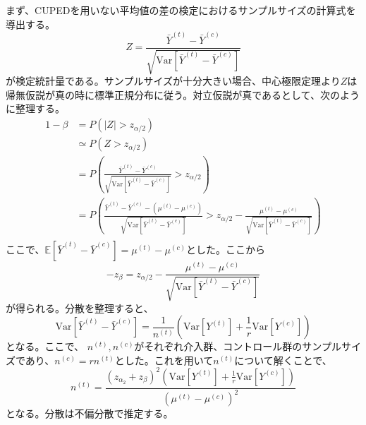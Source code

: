 まず、CUPEDを用いない平均値の差の検定におけるサンプルサイズの計算式を導出する。
\begin{equation}
    Z = \frac{\bar{Y}^{(t)} - \bar{Y}^{(c)}}{\sqrt{\text{Var}[\bar{Y}^{(t)} - \bar{Y}^{(c)}]}}
\end{equation}
が検定統計量である。サンプルサイズが十分大きい場合、中心極限定理より$Z$は帰無仮説が真の時に標準正規分布に従う。対立仮説が真であるとして、次のように整理する。
\begin{align}
    1 - \beta & = P(|Z| > z_{\alpha/2})                                                                                                                                                                                                          \\
              & \simeq P(Z > z_{\alpha / 2})                                                                                                                                                                                                     \\
              & = P\left(\frac{\bar{Y}^{(t)} - \bar{Y}^{(c)}}{\sqrt{\text{Var}[\bar{Y}^{(t)} - \bar{Y}^{(c)}]}} > z_{\alpha/2}\right)                                                                                                            \\
              & = P\left(\frac{\bar{Y}^{(t)} - \bar{Y}^{(c)} - (\mu^{(t)} - \mu^{(c)})}{\sqrt{\text{Var}[\bar{Y}^{(t)} - \bar{Y}^{(c)}]}} > z_{\alpha/2} - \frac{\mu^{(t)} - \mu^{(c)}}{\sqrt{\text{Var}[\bar{Y}^{(t)} - \bar{Y}^{(c)}]}}\right) \\
\end{align}
ここで、$\mathbb{E}[\bar{Y}^{(t)} - \bar{Y}^{(c)}] = \mu^{(t)} - \mu^{(c)}$とした。ここから
\begin{equation}
    -z_{\beta} = z_{\alpha/2} - \frac{\mu^{(t)} - \mu^{(c)}}{\sqrt{\text{Var}[\bar{Y}^{(t)} - \bar{Y}^{(c)}]}}
\end{equation}
が得られる。分散を整理すると、
\begin{equation}
    \text{Var}[\bar{Y}^{(t)} - \bar{Y}^{(c)}] = \frac{1}{n^{(t)}}\left(\text{Var}[Y^{(t)}] + \frac{1}{r}\text{Var}[Y^{(c)}]\right)
\end{equation}
となる。ここで、 $n^{(t)}, n^{(c)}$がそれぞれ介入群、コントロール群のサンプルサイズであり、$n^{(c)} = rn^{(t)}$とした。これを用いて$n^{(t)}$について解くことで、
\begin{equation}
    n^{(t)} = \frac{(z_{\alpha_2} + z_{\beta})^{2}\left(\text{Var}[Y^{(t)}] + \frac{1}{r}\text{Var}[Y^{(c)}]\right)}{(\mu^{(t)} - \mu^{(c)})^{2}}
\end{equation}
となる。分散は不偏分散で推定する。


